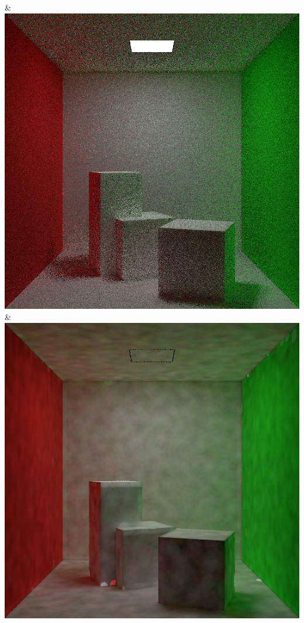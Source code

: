 & \includegraphics[width=\linewidth]{figures/py/tests/quality_comparison/nrc+sppc_1spp.png}
& \includegraphics[width=\linewidth]{figures/py/tests/quality_comparison/sppm_1spp.png}

